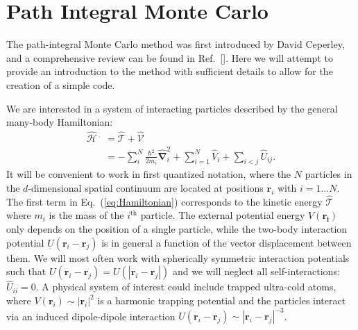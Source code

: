 \documentclass[prb,aps,amssym,nofootinbib,floatfix,notitlepage]{revtex4-1}
\renewcommand{\vec}[1]{\boldsymbol{#1}}
\renewcommand{\eqref}[1]{Eq.~(\ref{#1})}
\begin{document}
\section{Path Integral Monte Carlo}

The path-integral Monte Carlo method was first introduced by David Ceperley, and a
comprehensive review can be found in Ref.~[]. Here
we will attempt to provide an introduction to the method with sufficient
details to allow for the creation of a simple code.

We are interested in a system of interacting particles described by the
general many-body Hamiltonian:
%
\begin{align}
    \hat{\mathcal{H}} &= \hat{\mathcal{T}} + \hat{\mathcal{V}} \nonumber \\
                      &= -\sum_i^N \frac{\hbar^2}{2m_i} \hat{\vec{\nabla}}_i^2 
    + \sum_{i=1}^N \hat{V}_{i} + \sum_{i < j} \hat{U}_{ij}.
\label{eq:Hamiltonian}
\end{align}
%
It will be convenient to work in first quantized notation, where the $N$
particles in the $d$-dimensional spatial continuum are located at positions
$\vec{r}_i$ with $i=1\ldots N$.  The first term in \eqref{eq:Hamiltonian}
corresponds to the kinetic energy $\hat{\mathcal{T}}$ where $m_i$ is the mass
of the $i^{\text{th}}$ particle. The external potential energy $V(\vec{r_i})$
only depends on the position of a single particle, while the two-body
interaction potential $U(\vec{r}_i-\vec{r}_j)$ is in general a function of the
vector displacement between them.  We will most often work with spherically
symmetric interaction potentials such that $U(\vec{r}_i - \vec{r}_j) =
U(|\vec{r}_i-\vec{r}_j|)$ and we will neglect all self-interactions:
$\hat{U}_{ii} = 0$. A physical system of interest could include trapped
ultra-cold atoms, where $V(\vec{r}_i) \sim |\vec{r}_i|^2$ is a harmonic
trapping potential and the particles interact via an induced dipole-dipole
interaction $U(\vec{r}_i - \vec{r}_j) \sim |\vec{r}_i-\vec{r}_j|^{-3}$.
\end{document}
